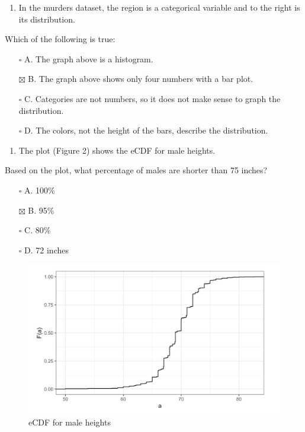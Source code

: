 \documentclass[
]{article}
\providecommand{\tightlist}{%
  \setlength{\itemsep}{0pt}\setlength{\parskip}{0pt}}
\begin{document}
\begin{enumerate}
\def\labelenumi{\arabic{enumi}.}
\setcounter{enumi}{1}
\tightlist
\item
  In the murders dataset, the region is a categorical variable and to
  the right is its distribution.
\end{enumerate}

Which of the following is true:

\begin{itemize}
\tightlist
\item[$\square$]
  A. The graph above is a histogram.
\item[$\boxtimes$]
  B. The graph above shows only four numbers with a bar plot.
\item[$\square$]
  C. Categories are not numbers, so it does not make sense to graph the
  distribution.
\item[$\square$]
  D. The colors, not the height of the bars, describe the distribution.
\end{itemize}

\begin{enumerate}
\def\labelenumi{\arabic{enumi}.}
\setcounter{enumi}{2}
\tightlist
\item
  The plot (Figure 2) shows the eCDF for male heights.
\end{enumerate}

Based on the plot, what percentage of males are shorter than 75 inches?

\begin{itemize}
\tightlist
\item[$\square$]
  A. 100\%
\item[$\boxtimes$]
  B. 95\%
\item[$\square$]
  C. 80\%
\item[$\square$]
  D. 72 inches
\end{itemize}

\begin{figure}
\centering
\includegraphics{images/eCDF for male heights.png}
\caption{eCDF for male heights}
\end{figure}
\end{document}
